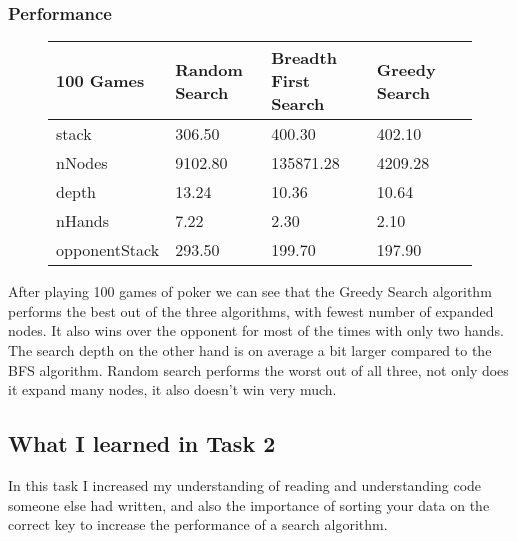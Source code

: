 \documentclass{article}
\begin{document}
\subsubsection{Performance}
\begin{figure}[H]
    \center
    \begin{tabular}{llllr}
        \toprule
        {100 Games} & {Random Search} & {Breadth First Search} & {Greedy Search}  \\
        \midrule
        stack         &   306.50 &     400.30 &   402.10 \\ 
        nNodes        &  9102.80 &  135871.28 &  4209.28 \\
        depth         &    13.24 &      10.36 &    10.64 \\
        nHands        &     7.22 &       2.30 &     2.10 \\
        opponentStack &   293.50 &     199.70 &   197.90 \\
        \bottomrule
    \end{tabular}
       
\end{figure}
After playing 100 games of poker we can see that the Greedy Search algorithm performs the best
out of the three algorithms, with fewest number of expanded nodes. It also wins over the opponent
for most of the times with only two hands. The search depth on the other hand is on average a bit
larger compared to the BFS algorithm. Random search performs the worst out of all three, not only
does it expand many nodes, it also doesn't win very much.

\subsection{What I learned in Task 2}
In this task I increased my understanding of reading and understanding code someone else had written,
and also the importance of sorting your data on the correct key to increase the performance of a search algorithm.
\end{document}
